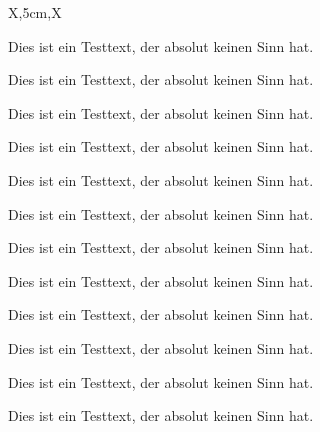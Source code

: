 \documentclass[a3paper,13pt,scifiposter,style=scifi]{tubsposter}
\begin{document}
\begin{modulepage}[sender=bottom]{X,5cm,X}
  \begin{posterrow}
    Dies ist ein Testtext, der absolut keinen Sinn hat.
  \end{posterrow}
  \begin{posterrow}[X,3cm,X]
    \begin{postercol}[X,X]
      \begin{postersubrow}
        Dies ist ein Testtext, der absolut keinen Sinn hat.
      \end{postersubrow}
      \begin{postersubrow}
        Dies ist ein Testtext, der absolut keinen Sinn hat.
      \end{postersubrow}
    \end{postercol}
    \begin{postercol}[X,X]
      \begin{postersubrow}
        Dies ist ein Testtext, der absolut keinen Sinn hat.
      \end{postersubrow}
      \begin{postersubrow}
        Dies ist ein Testtext, der absolut keinen Sinn hat.
      \end{postersubrow}
    \end{postercol}
    \begin{postercol}
      Dies ist ein Testtext, der absolut keinen Sinn hat.
    \end{postercol}
  \end{posterrow}
  \begin{posterrow}[X,X,X,X]
    \begin{postercol}
      Dies ist ein Testtext, der absolut keinen Sinn hat.
    \end{postercol}
    \begin{postercol}[2cm,X,X]
      \begin{postersubrow}
        Dies ist ein Testtext, der absolut keinen Sinn hat.
      \end{postersubrow}
      \begin{postersubrow}
        Dies ist ein Testtext, der absolut keinen Sinn hat.
      \end{postersubrow}
      \begin{postersubrow}
        Dies ist ein Testtext, der absolut keinen Sinn hat.
      \end{postersubrow}
    \end{postercol}
    \begin{postercol}
      Dies ist ein Testtext, der absolut keinen Sinn hat.
    \end{postercol}
    \begin{postercol}
      Dies ist ein Testtext, der absolut keinen Sinn hat.
    \end{postercol}
  \end{posterrow}
\end{modulepage}
\end{document}
